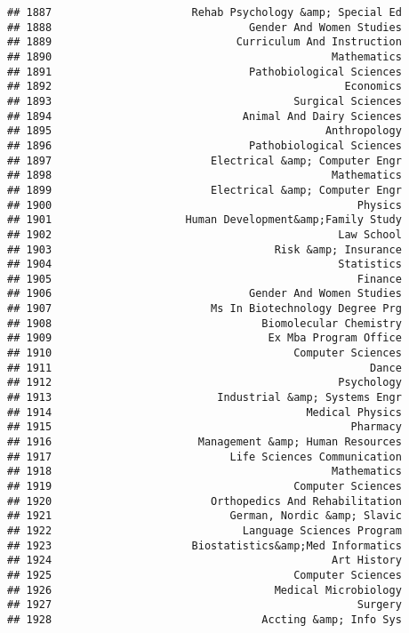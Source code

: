 \documentclass[
]{article}
\begin{document}
\begin{verbatim}
## 1887                      Rehab Psychology &amp; Special Ed
## 1888                               Gender And Women Studies
## 1889                             Curriculum And Instruction
## 1890                                            Mathematics
## 1891                               Pathobiological Sciences
## 1892                                              Economics
## 1893                                      Surgical Sciences
## 1894                              Animal And Dairy Sciences
## 1895                                           Anthropology
## 1896                               Pathobiological Sciences
## 1897                         Electrical &amp; Computer Engr
## 1898                                            Mathematics
## 1899                         Electrical &amp; Computer Engr
## 1900                                                Physics
## 1901                     Human Development&amp;Family Study
## 1902                                             Law School
## 1903                                   Risk &amp; Insurance
## 1904                                             Statistics
## 1905                                                Finance
## 1906                               Gender And Women Studies
## 1907                         Ms In Biotechnology Degree Prg
## 1908                                 Biomolecular Chemistry
## 1909                                  Ex Mba Program Office
## 1910                                      Computer Sciences
## 1911                                                  Dance
## 1912                                             Psychology
## 1913                          Industrial &amp; Systems Engr
## 1914                                        Medical Physics
## 1915                                               Pharmacy
## 1916                       Management &amp; Human Resources
## 1917                            Life Sciences Communication
## 1918                                            Mathematics
## 1919                                      Computer Sciences
## 1920                         Orthopedics And Rehabilitation
## 1921                            German, Nordic &amp; Slavic
## 1922                              Language Sciences Program
## 1923                      Biostatistics&amp;Med Informatics
## 1924                                            Art History
## 1925                                      Computer Sciences
## 1926                                   Medical Microbiology
## 1927                                                Surgery
## 1928                                 Accting &amp; Info Sys

\end{verbatim}
\end{document}
